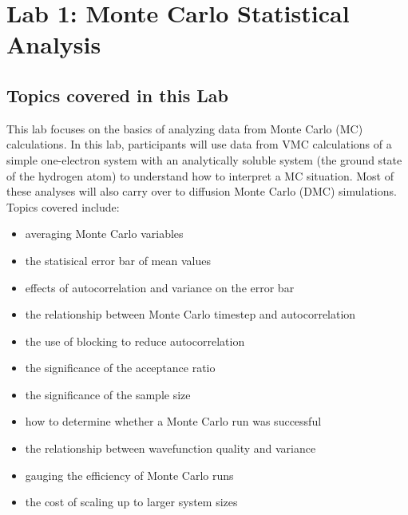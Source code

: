 
\chapter{Lab 1: Monte Carlo Statistical Analysis}
\label{chap:lab_qmc_statistics}


\section{Topics covered in this Lab} 

This lab focuses on the basics of analyzing data from Monte Carlo (MC)
calculations.  In this lab, participants will use data from
VMC calculations of a simple one-electron system with an analytically soluble
system (the ground state of the hydrogen atom) to understand how to interpret a
MC situation.  Most of these analyses will also carry over to diffusion Monte
Carlo (DMC) simulations.  Topics covered include:
\begin{itemize}
  \item{averaging Monte Carlo variables}
  \item{the statisical error bar of mean values}
  \item{effects of autocorrelation and variance on the error bar}
  \item{the relationship between Monte Carlo timestep and autocorrelation}
  \item{the use of blocking to reduce autocorrelation}
  \item{the significance of the acceptance ratio}
  \item{the significance of the sample size}
  \item{how to determine whether a Monte Carlo run was successful}
  \item{the relationship between wavefunction quality and variance}
  \item{gauging the efficiency of Monte Carlo runs}
  \item{the cost of scaling up to larger system sizes}
\end{itemize}



